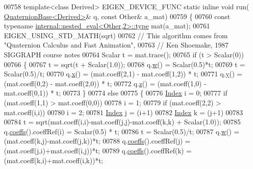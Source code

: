 \begin{DoxyCode}
{00758   \textcolor{keyword}{template}<\textcolor{keyword}{class} Derived> EIGEN\_DEVICE\_FUNC \textcolor{keyword}{static} \textcolor{keyword}{inline} \textcolor{keywordtype}{void} run(
      \hyperlink{group___geometry___module_class_eigen_1_1_quaternion_base}{QuaternionBase<Derived>}& q, \textcolor{keyword}{const} Other& a\_mat)
00759   \{
00760     \textcolor{keyword}{const} \textcolor{keyword}{typename} \hyperlink{class_eigen_1_1internal_1_1_tensor_lazy_evaluator_writable}{internal::nested\_eval<Other,2>::type} mat(a\_mat);
00761     EIGEN\_USING\_STD\_MATH(sqrt)
00762     \textcolor{comment}{// This algorithm comes from  "Quaternion Calculus and Fast Animation",}
00763     \textcolor{comment}{// Ken Shoemake, 1987 SIGGRAPH course notes}
00764     Scalar t = mat.trace();
00765     \textcolor{keywordflow}{if} (t > Scalar(0))
00766     \{
00767       t = sqrt(t + Scalar(1.0));
00768       q.\hyperlink{group___geometry___module_a1f3f580927483150d4558c327988a9b4}{w}() = Scalar(0.5)*t;
00769       t = Scalar(0.5)/t;
00770       q.\hyperlink{group___geometry___module_a782b9d83caa9bbe84d6e0b822f2dbea9}{x}() = (mat.coeff(2,1) - mat.coeff(1,2)) * t;
00771       q.\hyperlink{group___geometry___module_a8c7883015c5fa41aa5107350279a5229}{y}() = (mat.coeff(0,2) - mat.coeff(2,0)) * t;
00772       q.\hyperlink{group___geometry___module_abb82ebd1b6ac5e6c4442201ede65449b}{z}() = (mat.coeff(1,0) - mat.coeff(0,1)) * t;
00773     \}
00774     \textcolor{keywordflow}{else}
00775     \{
00776       \hyperlink{namespace_eigen_a62e77e0933482dafde8fe197d9a2cfde}{Index} i = 0;
00777       \textcolor{keywordflow}{if} (mat.coeff(1,1) > mat.coeff(0,0))
00778         i = 1;
00779       \textcolor{keywordflow}{if} (mat.coeff(2,2) > mat.coeff(i,i))
00780         i = 2;
00781       \hyperlink{namespace_eigen_a62e77e0933482dafde8fe197d9a2cfde}{Index} j = (i+1)%
00782       \hyperlink{namespace_eigen_a62e77e0933482dafde8fe197d9a2cfde}{Index} k = (j+1)%
00783 
00784       t = sqrt(mat.coeff(i,i)-mat.coeff(j,j)-mat.coeff(k,k) + Scalar(1.0));
00785       q.\hyperlink{group___geometry___module_aa7bb3fc337ffa82b0ad795783eb8a2ce}{coeffs}().coeffRef(i) = Scalar(0.5) * t;
00786       t = Scalar(0.5)/t;
00787       q.\hyperlink{group___geometry___module_a1f3f580927483150d4558c327988a9b4}{w}() = (mat.coeff(k,j)-mat.coeff(j,k))*t;
00788       q.\hyperlink{group___geometry___module_aa7bb3fc337ffa82b0ad795783eb8a2ce}{coeffs}().coeffRef(j) = (mat.coeff(j,i)+mat.coeff(i,j))*t;
00789       q.\hyperlink{group___geometry___module_aa7bb3fc337ffa82b0ad795783eb8a2ce}{coeffs}().coeffRef(k) = (mat.coeff(k,i)+mat.coeff(i,k))*t;
}
\end{DoxyCode}
